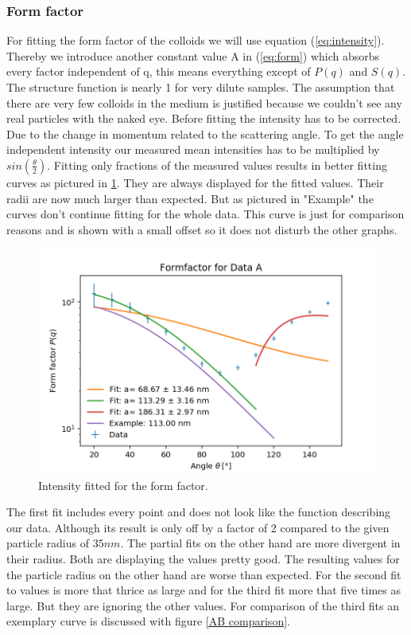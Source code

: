\documentclass[]{article}
\begin{document}
\subsubsection{Form factor}

For fitting the form factor of the colloids we will use equation (\ref{eq:intensity}). Thereby we introduce another constant value A in (\ref{eq:form}) which absorbs every factor independent of q, this means everything except of $P(q)$ and $S(q)$. The structure function is nearly 1 for very dilute samples. The assumption that there are very few colloids in the medium is justified because we couldn't see any real particles with the naked eye. 
Before fitting the intensity has to be corrected. Due to the change in momentum related to the scattering angle. To get the angle independent intensity our measured mean intensities has to be multiplied by $sin(\frac{\theta}{2} )$.
Fitting only fractions of the measured values results in better fitting curves as pictured in \ref{FormA}. They are always displayed for the fitted values. Their radii are now much larger than expected. But as pictured in "Example" the curves don't continue fitting for the whole data. This curve is just for comparison reasons and is shown with a small offset so it does not disturb the other graphs. 

\begin{figure}[!htbp]
\centering
\includegraphics[width=0.8\linewidth]{Plots/FormA.png}
\caption{Intensity fitted for the form factor.}
\label{FormA}
\end{figure}

The first fit includes every point and does not look like the function describing our data. Although its result is only off by a factor of 2 compared to the given particle radius of $35nm$. The partial fits on the other hand are more divergent in their radius. Both are displaying the values pretty good. The resulting values for the particle radius on the other hand are worse than expected. For the second fit to values is more that thrice as large and for the third fit more that five times as large. But they are ignoring the other values. For comparison of the third fits an exemplary curve is discussed with figure \ref{AB comparison}. 
\end{document}
